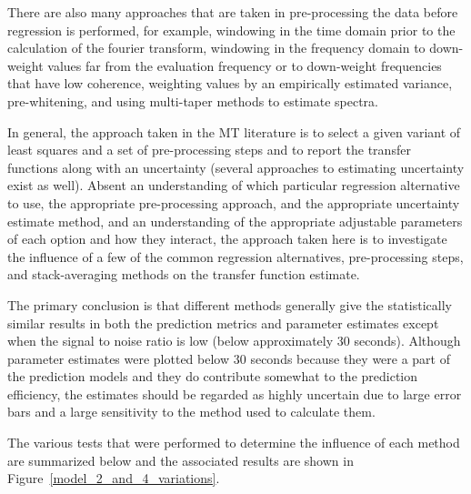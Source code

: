 \documentclass[draft,linenumbers]{agujournal2018}
\begin{document}
There are also many approaches that are taken in pre-processing the data before regression is performed, for example, windowing in the time domain prior to the calculation of the fourier transform, windowing in the frequency domain to down-weight values far from the evaluation frequency or to down-weight frequencies that have low coherence, weighting values by an empirically estimated variance, pre-whitening, and using multi-taper methods to estimate spectra.

In general, the approach taken in the MT literature is to select a given variant of least squares and a set of pre-processing steps and to report the transfer functions along with an uncertainty (several approaches to estimating uncertainty exist as well). Absent an understanding of which particular regression alternative to use, the appropriate pre-processing approach, and the appropriate uncertainty estimate method, and an understanding of the appropriate adjustable parameters of each option and how they interact, the approach taken here is to investigate the influence of a few of the common regression alternatives, pre-processing steps, and stack-averaging methods on the transfer function estimate. 

The primary conclusion is that different methods generally give the statistically similar results in both the prediction metrics and parameter estimates except when the signal to noise ratio is low (below approximately $30$ seconds). Although parameter estimates were plotted below $30$ seconds because they were a part of the prediction models and they do contribute somewhat to the prediction efficiency, the estimates should be regarded as highly uncertain due to large error bars and a large sensitivity to the method used to calculate them.

The various tests that were performed to determine the influence of each method are summarized below and the associated results are shown in Figure~\ref{model_2_and_4_variations}.
\end{document}
